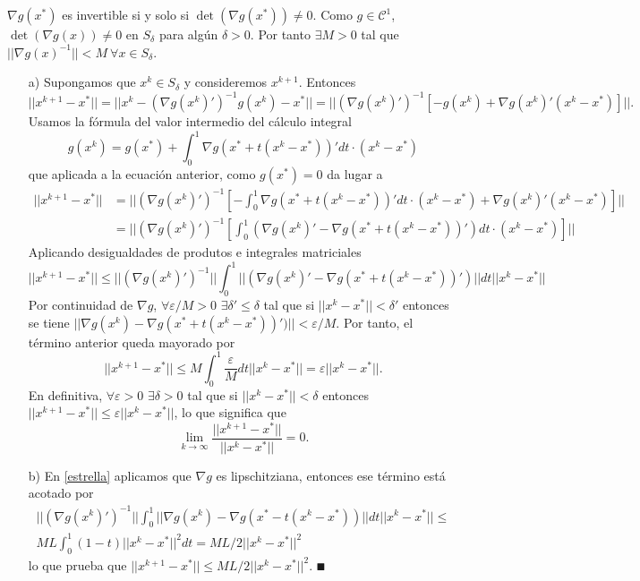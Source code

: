 \documentclass[MIOP.tex]{subfiles}
\begin{document}
\begin{dem}
$\nabla g(x^*)$ es invertible si y solo si $\det(\nabla g(x^*))\neq 0$. Como $g \in \mathcal{C}^1$, $\det(\nabla g(x))\neq 0$ en $S_\delta$ para algún $\delta>0$. Por tanto $\exists M>0$ tal que $||\nabla g(x)^{-1}||<M\ \forall x\in S_\delta$. 
\begin{itemize}
\item[a)] Supongamos que $x^k\in S_\delta$ y consideremos $x^{k+1}$. Entonces
$$||x^{k+1}-x^*||=||x^k-(\nabla g(x^k)')^{-1}g(x^k)-x^*||=||(\nabla g(x^k)')^{-1}[-g(x^k)+\nabla g(x^k)'(x^k-x^*)]||.$$
Usamos la fórmula del valor intermedio del cálculo integral
$$g(x^k)=g(x^*)+\int_0^1\nabla g(x^*+t(x^k-x^*))'dt\cdot(x^k-x^*)$$
que aplicada a la ecuación anterior, como $g(x^*)=0$  da lugar a
\begin{align*}
||x^{k+1}-x^*||&=||(\nabla g(x^k)')^{-1}\left[-\int_0^1\nabla g(x^*+t(x^k-x^*))'dt\cdot(x^k-x^*)+\nabla g(x^k)'(x^k-x^*)\right]||\\
&=||(\nabla g(x^k)')^{-1}\left[\int_0^1(\nabla g(x^k)'-\nabla g(x^*+t(x^k-x^*))')dt\cdot(x^k-x^*)\right]||
\end{align*}
Aplicando desigualdades de produtos e integrales matriciales
\begin{equation}\label{estrella}
||x^{k+1}-x^*||\leq||(\nabla g(x^k)')^{-1}||\int_0^1||(\nabla g(x^k)'-\nabla g(x^*+t(x^k-x^*))')||dt||x^k-x^*||
\end{equation}
Por continuidad de $\nabla g$, $\forall\varepsilon/M>0$ $\exists\delta'\leq\delta$ tal que si $||x^k-x^*||<\delta'$ entonces se tiene $ ||\nabla g(x^k)-\nabla g(x^*+t(x^k-x^*))')||<\varepsilon/M$. Por tanto, el término anterior queda mayorado por
$$||x^{k+1}-x^*|| \leq M\int_0^1\frac{\varepsilon}{M} dt ||x^k-x^*||=\varepsilon ||x^k-x^*||.$$
En definitiva, $\forall\varepsilon>0$ $\exists \delta>0$ tal que si $||x^k-x^*||<\delta$ entonces $ ||x^{k+1}-x^*||\leq\varepsilon||x^k-x^*||$, lo que significa que $$\lim_{k\to\infty}\frac{||x^{k+1}-x^*||}{||x^k-x^*||}=0.$$
\item[b)] En \ref{estrella} aplicamos que $\nabla g$ es lipschitziana, entonces ese término está acotado por
\begin{gather*}
||(\nabla g(x^k)')^{-1}||\int_0^1||\nabla g(x^k)-\nabla g(x^*-t(x^k-x^*))||dt||x^k-x^*||\leq\\
 ML\int_0^1 (1-t)||x^k-x^*||^2dt=ML/2||x^k-x^*||^2
\end{gather*}
lo que prueba que $ ||x^{k+1}-x^*||\leq ML/2||x^k-x^*||^2$. $\QED$
\end{itemize}
\end{dem}
\end{document}
